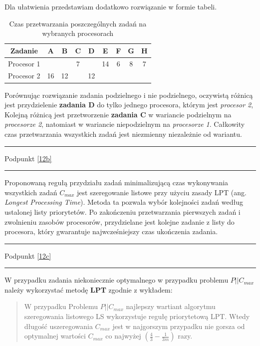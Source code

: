 \documentclass[
    12pt, %
]{../fphw}
\begin{document}
\newpage

Dla ułatwienia przedstawiam dodatkowo rozwiązanie w formie tabeli.
\begin{table}[H]
    \centering
    \begin{tabular}{| c | c | c | c | c | c | c | c | c |}
        \hline
        Zadanie    & A  & B  & C & D  & E  & F & G & H \\
        \hline
        Procesor 1 &    &    & 7 &    & 14 & 6 & 8 & 7 \\
        \hline
        Procesor 2 & 16 & 12 &   & 12 &    &   &   &   \\
        \hline
    \end{tabular}
    \caption{Czas przetwarzania poszczególnych zadań na wybranych procesorach}
\end{table}

Porównując rozwiązanie zadania podzielnego i nie podzielnego,
oczywistą różnicą jest przydzielenie \textbf{zadania D} do tylko jednego procesora,
którym jest \textit{procesor 2},
Kolejną różnicą jest przetworzenie \textbf{zadania C} w wariancie podzielnym
na \textit{procesorze 2}, natomiast w wariancie niepodzielnym na \textit{procesorze 1}.
Całkowity czas przetwarzania wszystkich zadań jest niezmienny niezależnie od wariantu.
\par\noindent\rule{\textwidth}{0.4pt}
Podpunkt \ref{12b}
\par\noindent\rule{\textwidth}{0.4pt}
Proponowaną regułą przydziału zadań minimalizującą czas wykonywania wszystkich
zadań \(C_{max}\) jest szeregowanie listowe przy użyciu zasady LPT (ang. \textit{Longest Processing Time}).
Metoda ta pozwala wybór kolejności zadań według ustalonej listy priorytetów.
Po zakończeniu przetwarzania pierwszych zadań i zwolnieniu zasobów
procesorów, przydzielane jest kolejne zadanie z listy do procesora,
który gwarantuje najwcześniejszy czas ukończenia zadania.

\par\noindent\rule{\textwidth}{0.4pt}
Podpunkt \ref{12c}
\par\noindent\rule{\textwidth}{0.4pt}
W przypadku zadania niekoniecznie optymalnego w przypadku problemu \(P||C_{max}\)
należy wykorzystać metodę \textbf{LPT} zgodnie z wykładem:
\begin{quote}
    W przypadku Problemu \(P ||C_{max}\) najlepszy wartiant algorytmu szeregowania listowego LS wykorzystuje regułę priorytetową LPT.
    Wtedy długość uszeregowania \(C_{max}\) jest w najgorszym przypadku nie gorsza od optymalnej wartości \(C_{max}\)
    co najwyżej \( (\frac{4}{3} - \frac{1}{3m} )\) razy.
\end{quote}
\newpage
\end{document}
